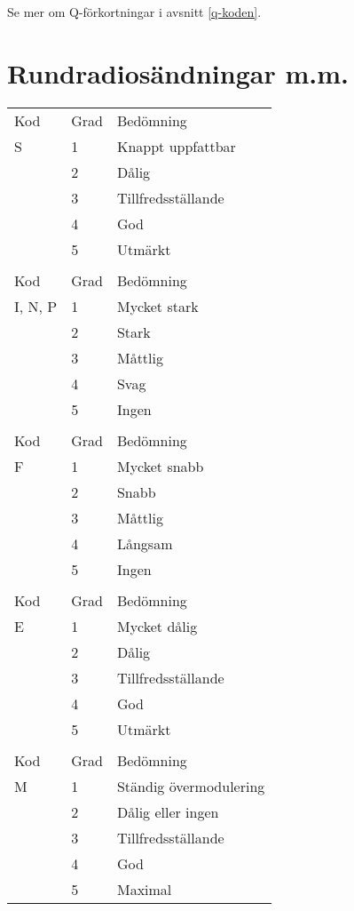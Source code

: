 Se mer om Q-förkortningar i avsnitt \ref{q-koden}.

\section{Rundradiosändningar m.m.}
\label{sinpo}

\begin{table}[ht]
  \begin{center}
\begin{tabular}{lll}
  Kod & Grad & Bedömning \\
  S   & 1    & Knappt uppfattbar \\
      & 2    & Dålig \\
      & 3    & Tillfredsställande \\
      & 4    & God \\
      & 5    & Utmärkt \\
  & & \\

  Kod     & Grad & Bedömning \\
  I, N, P & 1    & Mycket stark \\
          & 2    & Stark \\
          & 3    & Måttlig \\
          & 4    & Svag \\
          & 5    & Ingen \\
  & & \\

  Kod & Grad & Bedömning \\
  F   & 1    & Mycket snabb \\
      & 2    & Snabb \\
      & 3    & Måttlig \\
      & 4    & Långsam \\
      & 5    & Ingen \\

  & & \\
  Kod & Grad & Bedömning \\
  E   & 1    & Mycket dålig \\
      & 2    & Dålig \\
      & 3    & Tillfredsställande \\
      & 4    & God \\
      & 5    & Utmärkt \\

  & & \\
  Kod & Grad & Bedömning \\
  M   & 1    & Ständig övermodulering \\
      & 2    & Dålig eller ingen \\
      & 3    & Tillfredsställande \\
      & 4    & God \\
      & 5    & Maximal \\


\end{tabular}
\end{center}
\end{table}
